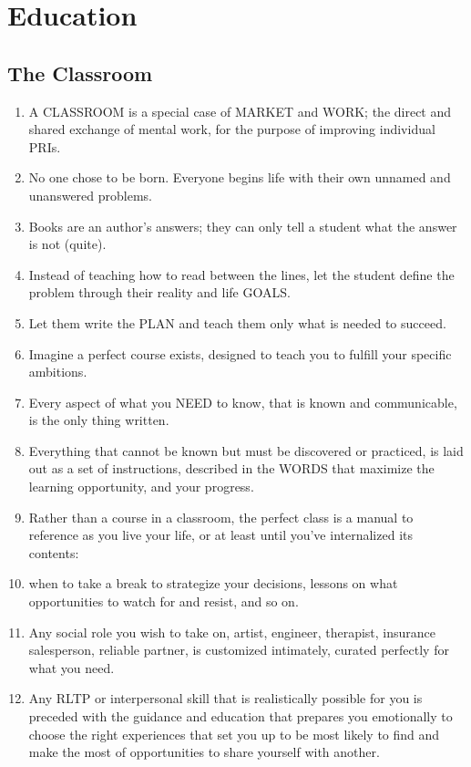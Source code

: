 \documentclass[
]{book}
\providecommand{\tightlist}{%
  \setlength{\itemsep}{0pt}\setlength{\parskip}{0pt}}
\begin{document}
\hypertarget{education}{%
\chapter{Education}\label{education}}

\hypertarget{the-classroom}{%
\section{The Classroom}\label{the-classroom}}

\begin{enumerate}
\def\labelenumi{\arabic{enumi}.}
\tightlist
\item
  A CLASSROOM is a special case of MARKET and WORK; the direct and
  shared exchange of mental work, for the purpose of improving
  individual PRIs.
\item
  No one chose to be born. Everyone begins life with their own unnamed
  and unanswered problems.
\item
  Books are an author's answers; they can only tell a student what the
  answer is not (quite).
\item
  Instead of teaching how to read between the lines, let the student
  define the problem through their reality and life GOALS.
\item
  Let them write the PLAN and teach them only what is needed to
  succeed.
\item
  Imagine a perfect course exists, designed to teach you to fulfill
  your specific ambitions.
\item
  Every aspect of what you NEED to know, that is known and
  communicable, is the only thing written.
\item
  Everything that cannot be known but must be discovered or practiced,
  is laid out as a set of instructions, described in the WORDS that
  maximize the learning opportunity, and your progress.
\item
  Rather than a course in a classroom, the perfect class is a manual
  to reference as you live your life, or at least until you've
  internalized its contents:
\item
  when to take a break to strategize your decisions, lessons on what
  opportunities to watch for and resist, and so on.
\item
  Any social role you wish to take on, artist, engineer, therapist,
  insurance salesperson, reliable partner, is customized intimately,
  curated perfectly for what you need.
\item
  Any RLTP or interpersonal skill that is realistically possible for
  you is preceded with the guidance and education that prepares you
  emotionally to choose the right experiences that set you up to be
  most likely to find and make the most of opportunities to share
  yourself with another.
\end{enumerate}
\end{document}
